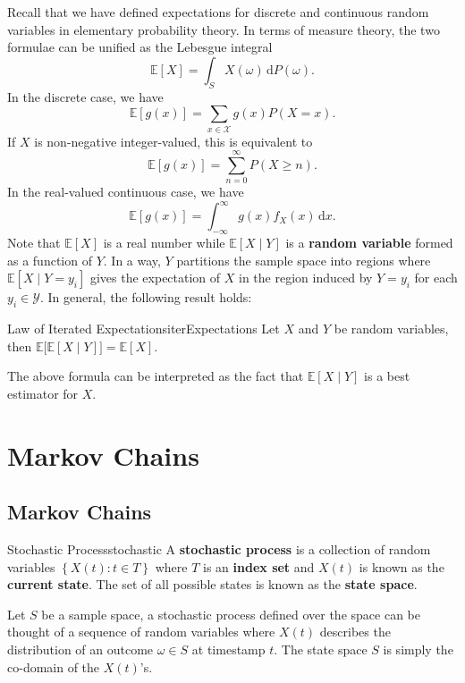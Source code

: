 \documentclass[math, code]{amznotes}
\theoremstyle{remark}
\renewcommand{\d}{\mathrm{d}}
\begin{document}
Recall that we have defined expectations for discrete and continuous random variables in elementary probability theory. In terms of measure theory, the two formulae can be unified as the Lebesgue integral
\begin{equation*}
    \mathbb{E}[X] = \int_{S}\!X\left(\omega\right)\,\d P\left(\omega\right).
\end{equation*}
In the discrete case, we have 
\begin{equation*}
    \mathbb{E}\left[g\left(x\right)\right] = \sum_{x \in \mathcal{X}}g\left(x\right)P\left(X = x\right).
\end{equation*}
If $X$ is non-negative integer-valued, this is equivalent to 
\begin{equation*}
    \mathbb{E}\left[g\left(x\right)\right] = \sum_{n = 0}^{\infty}P\left(X \geq n\right).
\end{equation*}
In the real-valued continuous case, we have 
\begin{equation*}
    \mathbb{E}\left[g\left(x\right)\right] = \int_{-\infty}^{\infty}\!g\left(x\right)f_X\left(x\right)\,\d x.
\end{equation*}
Note that $\mathbb{E}[X]$ is a real number while $\mathbb{E}[X \mid Y]$ is a \textbf{random variable} formed as a function of $Y$. In a way, $Y$ partitions the sample space into regions where $\mathbb{E}[X \mid Y = y_i]$ gives the expectation of $X$ in the region induced by $Y = y_i$ for each $y_i \in \mathcal{Y}$. In general, the following result holds:
\begin{thmbox}{Law of Iterated Expectations}{iterExpectations}
    Let $X$ and $Y$ be random variables, then $\mathbb{E}\bigl[\mathbb{E}[X \mid Y]\bigr] = \mathbb{E}[X]$.
\end{thmbox}
The above formula can be interpreted as the fact that $\mathbb{E}[X \mid Y]$ is a best estimator for $X$.
\chapter{Markov Chains}
\section{Markov Chains}
\begin{dfnbox}{Stochastic Process}{stochastic}
    A {\color{red} \textbf{stochastic process}} is a collection of random variables $\left\{X\left(t\right) \colon t \in T\right\}$ where $T$ is an {\color{red} \textbf{index set}} and $X\left(t\right)$ is known as the {\color{red} \textbf{current state}}. The set of all possible states is known as the {\color{red} \textbf{state space}}.
\end{dfnbox}
Let $S$ be a sample space, a stochastic process defined over the space can be thought of a sequence of random variables where $X\left(t\right)$ describes the distribution of an outcome $\omega \in S$ at timestamp $t$. The state space $S$ is simply the co-domain of the $X\left(t\right)$'s.
\end{document}

